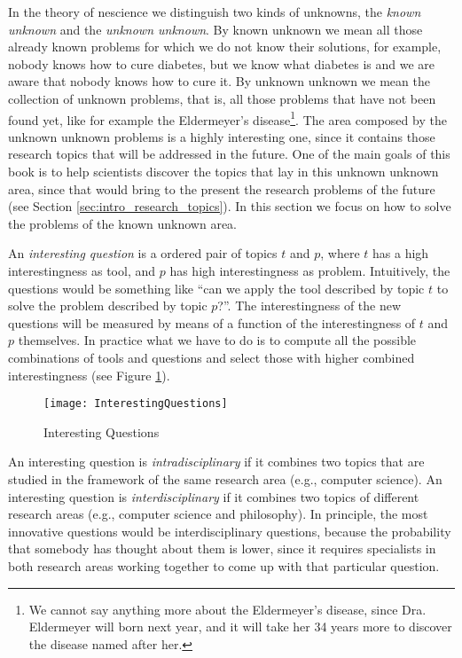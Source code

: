 In the theory of nescience we distinguish two kinds of unknowns, the \emph{known unknown} and the \emph{unknown unknown}. By known unknown we mean all those already known problems for which we do not know their solutions, for example, nobody knows how to cure diabetes, but we know what diabetes is and we are aware that nobody knows how to cure it. By unknown unknown we mean the collection of unknown problems, that is, all those problems that have not been found yet, like for example the Eldermeyer's disease\footnote{We cannot say anything more about the Eldermeyer's disease, since Dra. Eldermeyer will born next year, and it will take her 34 years more to discover the disease named after her.}. The area composed by the unknown unknown problems is a highly interesting one, since it contains those research topics that will be addressed in the future. One of the main goals of this book is to help scientists discover the topics that lay in this unknown unknown area, since that would bring to the present the research problems of the future (see Section \ref{sec:intro_research_topics}). In this section we focus on how to solve the problems of the known unknown area.

An \emph{interesting question} is a ordered pair of topics $t$ and $p$, where $t$ has a high interestingness as tool, and $p$ has high interestingness as problem. Intuitively, the questions would be something like “can we apply the tool described by topic $t$ to solve the problem described by topic $p$?”. The interestingness of the new questions will be measured by means of a function of the interestingness of $t$ and $p$ themselves. In practice what we have to do is to compute all the possible combinations of tools and questions and select those with higher combined interestingness (see Figure \ref{fig:InterestingQuestions}).

\begin{figure}[h]
\centering\texttt{[image: InterestingQuestions]}
\caption{\label{fig:InterestingQuestions}Interesting Questions}
\end{figure}

An interesting question is \emph{intradisciplinary} if it combines two topics that are studied in the framework of the same research area (e.g., computer science). An interesting question is \emph{interdisciplinary} if it combines two topics of different research areas (e.g., computer science and philosophy). In principle, the most innovative questions would be interdisciplinary questions, because the probability that somebody has thought about them is lower, since it requires specialists in both research areas working together to come up with that particular question.

